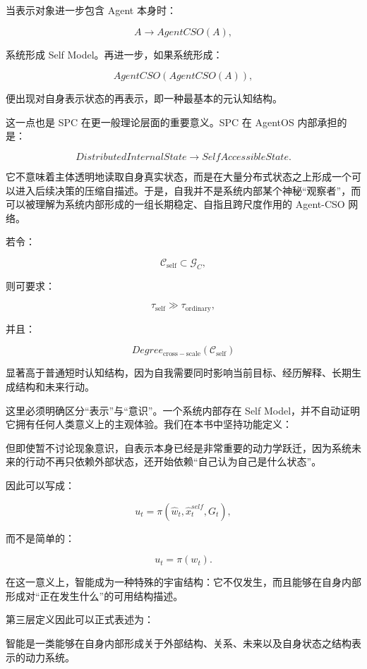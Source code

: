 当表示对象进一步包含 Agent 本身时：

\[
A
\rightarrow
AgentCSO(A),
\]

系统形成 Self Model。再进一步，如果系统形成：

\[
AgentCSO(
AgentCSO(A)
),
\]

便出现对自身表示状态的再表示，即一种最基本的元认知结构。

这一点也是 SPC 在更一般理论层面的重要意义。SPC 在 AgentOS 内部承担的是：

\[
DistributedInternalState
\rightarrow
SelfAccessibleState.
\]

它不意味着主体透明地读取自身真实状态，而是在大量分布式状态之上形成一个可以进入后续决策的压缩自描述。于是，自我并不是系统内部某个神秘“观察者”，而可以被理解为系统内部形成的一组长期稳定、自指且跨尺度作用的 Agent-CSO 网络。

若令：

\[
\mathcal C_{\mathrm{self}}
\subset
\mathcal G_C,
\]

则可要求：

\[
\tau_{\mathrm{self}}
\gg
\tau_{\mathrm{ordinary}},
\]

并且：

\[
Degree_{\mathrm{cross-scale}}
(
\mathcal C_{\mathrm{self}}
)
\]

显著高于普通短时认知结构，因为自我需要同时影响当前目标、经历解释、长期生成结构和未来行动。

这里必须明确区分“表示”与“意识”。一个系统内部存在 Self Model，并不自动证明它拥有任何人类意义上的主观体验。我们在本书中坚持功能定义：

\begin{statementbox}
\centering
{}
\end{statementbox}

但即使暂不讨论现象意识，自表示本身已经是非常重要的动力学跃迁，因为系统未来的行动不再只依赖外部状态，还开始依赖“自己认为自己是什么状态”。

因此可以写成：

\[
u_t
=
\pi
\left(
\hat w_t,
\hat x_t^{self},
G_t
\right),
\]

而不是简单的：

\[
u_t
=
\pi(w_t).
\]

在这一意义上，智能成为一种特殊的宇宙结构：它不仅发生，而且能够在自身内部形成对“正在发生什么”的可用结构描述。

第三层定义因此可以正式表述为：

\begin{definition*}
智能是一类能够在自身内部形成关于外部结构、关系、未来以及自身状态之结构表示的动力系统。
\end{definition*}

